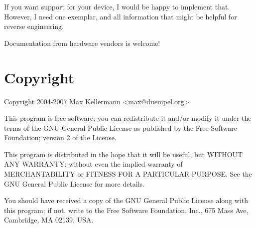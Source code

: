 \documentclass{article}
\begin{document}
If you want support for your device, I would be happy to implement
that.  However, I need one exemplar, and all information that might be
helpful for reverse engineering.

Documentation from hardware vendors is welcome!


\section{Copyright}

Copyright 2004-2007 Max Kellermann <max@duempel.org>

This program is free software; you can redistribute it and/or modify
it under the terms of the GNU General Public License as published by
the Free Software Foundation; version 2 of the License.

This program is distributed in the hope that it will be useful, but
WITHOUT ANY WARRANTY; without even the implied warranty of
MERCHANTABILITY or FITNESS FOR A PARTICULAR PURPOSE.  See the GNU
General Public License for more details.

You should have received a copy of the GNU General Public License
along with this program; if not, write to the Free Software
Foundation, Inc., 675 Mass Ave, Cambridge, MA 02139, USA.
\end{document}

